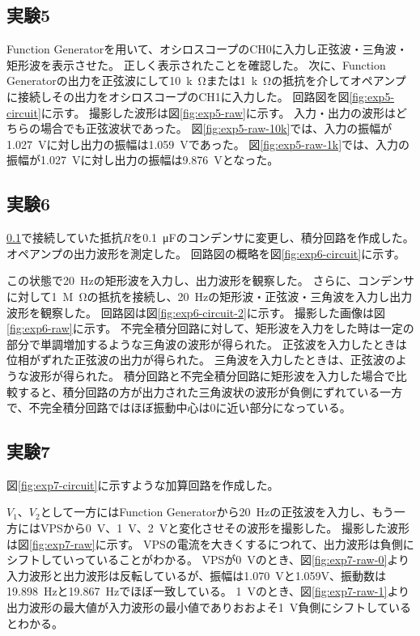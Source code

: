 \documentclass[../../../main]{subfiles}
\begin{document}
\subsection{実験5}\label{subsec:exp5}
Function Generatorを用いて、オシロスコープのCH0に入力し正弦波・三角波・矩形波を表示させた。
正しく表示されたことを確認した。
次に、Function Generatorの出力を正弦波にして\SI{10}{k\ohm}または\SI{1}{k\ohm}の抵抗を介してオペアンプに接続しその出力をオシロスコープのCH1に入力した。
回路図を図\ref{fig:exp5-circuit}に示す。
撮影した波形は図\ref{fig:exp5-raw}に示す。
入力・出力の波形はどちらの場合でも正弦波状であった。
図\ref{fig:exp5-raw-10k}では、入力の振幅が\SI{1.027}{V}に対し出力の振幅は\SI{1.059}{V}であった。
図\ref{fig:exp5-raw-1k}では、入力の振幅が\SI{1.027}{V}に対し出力の振幅は\SI{9.876}{V}となった。


\subsection{実験6}
\ref{subsec:exp5}で接続していた抵抗$R$を\SI{0.1}{\micro\farad}のコンデンサに変更し、積分回路を作成した。
オペアンプの出力波形を測定した。
回路図の概略を図\ref{fig:exp6-circuit}に示す。

この状態で\SI{20}{Hz}の矩形波を入力し、出力波形を観察した。
さらに、コンデンサに対して\SI{1}{M\ohm}の抵抗を接続し、\SI{20}{Hz}の矩形波・正弦波・三角波を入力し出力波形を観察した。
回路図は図\ref{fig:exp6-circuit-2}に示す。
撮影した画像は図\ref{fig:exp6-raw}に示す。
不完全積分回路に対して、矩形波を入力をした時は一定の部分で単調増加するような三角波の波形が得られた。
正弦波を入力したときは位相がずれた正弦波の出力が得られた。
三角波を入力したときは、正弦波のような波形が得られた。
積分回路と不完全積分回路に矩形波を入力した場合で比較すると、積分回路の方が出力された三角波状の波形が負側にずれている一方で、不完全積分回路ではほぼ振動中心は0に近い部分になっている。

\subsection{実験7}
図\ref{fig:exp7-circuit}に示すような加算回路を作成した。

$V_1$、$V_2$として一方にはFunction Generatorから\SI{20}{Hz}の正弦波を入力し、もう一方にはVPSから\SI{0}{V}、\SI{1}{V}、\SI{2}{V}と変化させその波形を撮影した。
撮影した波形は図\ref{fig:exp7-raw}に示す。
VPSの電流を大きくするにつれて、出力波形は負側にシフトしていっていることがわかる。
VPSが\SI{0}{V}のとき、図\ref{fig:exp7-raw-0}より入力波形と出力波形は反転しているが、振幅は\SI{1.070}{V}と{1.059}{V}、振動数は\SI{19.898}{Hz}と\SI{19.867}{Hz}でほぼ一致している。
\SI{1}{V}のとき、図\ref{fig:exp7-raw-1}より出力波形の最大値が入力波形の最小値でありおおよそ\SI{1}{V}負側にシフトしているとわかる。
\end{document}
